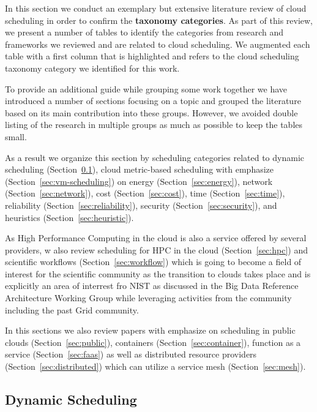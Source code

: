 \documentclass[final,5p,times,twocolumn]{elsarticle}
\begin{document}
In this section we conduct an exemplary but extensive literature
review of cloud scheduling in order to confirm the {\bf taxonomy
  categories}. As part of this review, we present a number of tables
to identify the categories from research and frameworks we reviewed
and are related to cloud scheduling. We augmented each table with a
first column that is highlighted and refers to the cloud scheduling
taxonomy category we identified for this work.

To provide an additional guide while grouping some work together we
have introduced a number of sections focusing on a topic and grouped
the literature based on its main contribution into these
groups. However, we avoided double listing of the research in multiple
groups as much as possible to keep the tables small.

As a result we organize this section by scheduling categories related to 
%
dynamic scheduling (Section~\ref{sec:dynamic}),
cloud metric-based scheduling with emphasize (Section~\ref{sec:vm-scheduling}) on 
energy (Section~\ref{sec:energy}),
network (Section~\ref{sec:network}),
cost (Section~\ref{sec:cost}),
time (Section~\ref{sec:time}),
reliability (Section~\ref{sec:reliability}),
security (Section~\ref{sec:security}), 
and heuristics (Section~\ref{sec:heuristic}).

As High Performance Computing in the cloud is also a service offered
by several providers, w also review scheduling for HPC in the cloud
(Section~\ref{sec:hpc}) and scientific workflows
(Section~\ref{sec:workflow}) which is going to become a field of
interest for the scientific community as the transition to clouds
takes place and is explicitly an area of interrest fro NIST as
discussed in the Big Data Reference Architecture Working Group while
leveraging activities from the community including the past Grid
community.

In this sections we also review papers with emphasize on scheduling in
public clouds (Section~\ref{sec:public}), 
containers (Section~\ref{sec:container}), function as a service
(Section~\ref{sec:faas}) as well as distributed resource providers
(Section~\ref{sec:distributed}) which can utilize a service mesh
(Section~\ref{sec:mesh}).





\subsection{Dynamic Scheduling}\label{sec:dynamic}
\end{document}
